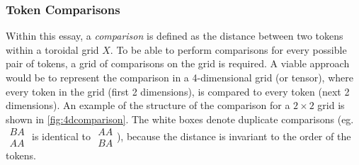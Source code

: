 \subsubsection{Token Comparisons}%
\label{ssub:token_comparisons}
Within this essay, a \emph{comparison} is defined as the distance between two tokens within a toroidal grid $X$. To be able to perform comparisons for every possible pair of tokens, a grid of comparisons on the grid is required. A viable approach would be to represent the comparison in a 4-dimensional grid (or tensor), where every token in the grid (first 2 dimensions), is compared to every token (next 2 dimensions). An example of the structure of the comparison for a $2\times 2$ grid is shown in \autoref{fig:4dcomparison}. The white boxes denote duplicate comparisons (eg. $
\begin{smallmatrix}
    BA\\ AA
\end{smallmatrix}
$ is identical to
$
\begin{smallmatrix}
    AA\\ BA
\end{smallmatrix}
$), because the distance is invariant to the order of the tokens.

